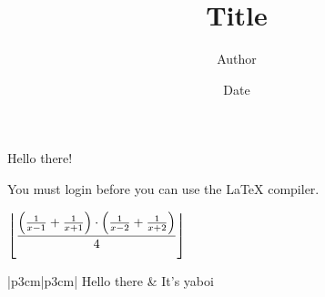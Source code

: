 \documentclass{article}
\title{Title}
\author{Author}
\date{Date}
\begin{document}
\maketitle

Hello there!

You must login before you can use the LaTeX compiler.

$\displaystyle\left\lfloor \frac{\left(\frac{1}{x-1} + \frac{1}{x+1}\right)\cdot\left(\frac{1}{x-2} + \frac{1}{x+2}\right)}{4}\right\rfloor$

\begin{mathtable}{|p{3cm}|p{3cm}|}
    \hline
    Hello there & It's yaboi \\
    \hline
\end{mathtable}
\end{document}
